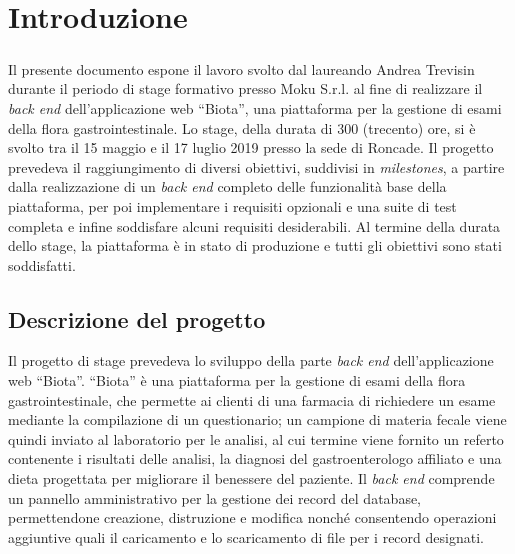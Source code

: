 
\chapter{Introduzione}
\label{introduction}
\paragraph{}
Il presente documento espone il lavoro svolto dal laureando Andrea Trevisin durante il periodo di stage formativo presso Moku S.r.l. al fine di realizzare il \textit{back end} dell'applicazione web ``Biota'', una piattaforma per la gestione di esami della flora gastrointestinale.
Lo stage, della durata di 300 (trecento) ore, si è svolto tra il 15 maggio e il 17 luglio 2019 presso la sede di Roncade. Il progetto prevedeva il raggiungimento di diversi obiettivi, suddivisi in \textit{milestones}, a partire dalla realizzazione di un \textit{back end} completo delle funzionalità base della piattaforma, per poi implementare i requisiti opzionali e una suite di test completa e infine soddisfare alcuni requisiti desiderabili.
Al termine della durata dello stage, la piattaforma è in stato di produzione e tutti gli obiettivi sono stati soddisfatti.

\section{Descrizione del progetto}
Il progetto di stage prevedeva lo sviluppo della parte \textit{back end} dell'applicazione web ``Biota''. ``Biota'' è una piattaforma per la gestione di esami della flora gastrointestinale, che permette ai clienti di una farmacia di richiedere un esame mediante la compilazione di un questionario; un campione di materia fecale viene quindi inviato al laboratorio per le analisi, al cui termine viene fornito un referto contenente i risultati delle analisi, la diagnosi del gastroenterologo affiliato e una dieta progettata per migliorare il benessere del paziente. Il \textit{back end} comprende un pannello amministrativo per la gestione dei record del database, permettendone creazione, distruzione e modifica nonché consentendo operazioni aggiuntive quali il caricamento e lo scaricamento di file per i record designati.

